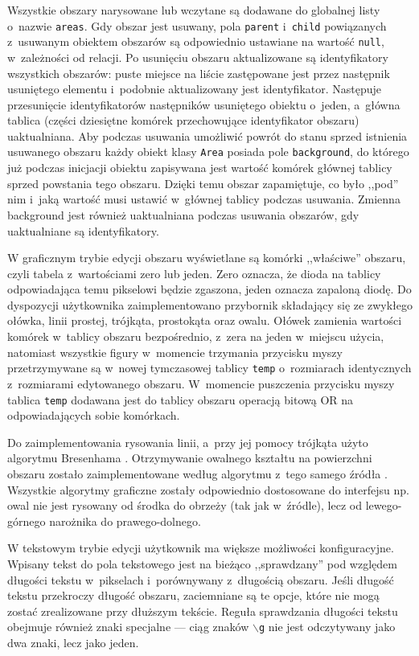 Wszystkie obszary narysowane lub wczytane są dodawane do globalnej listy o~nazwie \texttt{areas}. Gdy obszar jest usuwany, pola \texttt{parent} i~\texttt{child} powiązanych z~usuwanym obiektem obszarów są odpowiednio ustawiane na wartość \texttt{null}, w~zależności od relacji. Po usunięciu obszaru aktualizowane są identyfikatory wszystkich obszarów: puste miejsce na liście zastępowane jest przez następnik usuniętego elementu i~podobnie aktualizowany jest identyfikator. Następuje przesunięcie identyfikatorów następników usuniętego obiektu o~jeden, a~główna tablica (części dziesiętne komórek przechowujące identyfikator obszaru) uaktualniana. Aby podczas usuwania umożliwić powrót do stanu sprzed istnienia usuwanego obszaru każdy obiekt klasy \texttt{Area} posiada pole \texttt{background}, do którego już podczas inicjacji obiektu zapisywana jest wartość komórek głównej tablicy sprzed powstania tego obszaru. Dzięki temu obszar zapamiętuje, co było ,,pod'' nim i~jaką wartość musi ustawić w~głównej tablicy podczas usuwania. Zmienna background jest również uaktualniana podczas usuwania obszarów, gdy uaktualniane są identyfikatory.

W graficznym trybie edycji obszaru wyświetlane są komórki ,,właściwe'' obszaru, czyli tabela z~wartościami zero lub jeden. Zero oznacza, że dioda na tablicy odpowiadająca temu pikselowi będzie zgaszona, jeden oznacza zapaloną diodę. Do dyspozycji użytkownika zaimplementowano przybornik składający się ze zwykłego ołówka, linii prostej, trójkąta, prostokąta oraz owalu. Ołówek zamienia wartości komórek w~tablicy obszaru bezpośrednio, z~zera na jeden w~miejscu użycia, natomiast wszystkie figury w~momencie trzymania przycisku myszy przetrzymywane są w~nowej tymczasowej tablicy \texttt{temp} o~rozmiarach identycznych z~rozmiarami edytowanego obszaru. W~momencie puszczenia przycisku myszy tablica \texttt{temp} dodawana jest do tablicy obszaru operacją bitową OR na odpowiadających sobie komórkach.

Do zaimplementowania rysowania linii, a~przy jej pomocy trójkąta użyto algorytmu Bresenhama \cite{bresenham}. Otrzymywanie owalnego kształtu na powierzchni obszaru zostało zaimplementowane według algorytmu z~tego samego źródła \cite{ovals}. Wszystkie algorytmy graficzne zostały odpowiednio dostosowane do interfejsu np. owal nie jest rysowany od środka do obrzeży (tak jak w~źródle), lecz od lewego-górnego narożnika do prawego-dolnego.

W tekstowym trybie edycji użytkownik ma większe możliwości konfiguracyjne. Wpisany tekst do pola tekstowego jest na bieżąco ,,sprawdzany'' pod względem długości tekstu w~pikselach i~porównywany z~długością obszaru. Jeśli długość tekstu przekroczy długość obszaru, zaciemniane są te opcje, które nie mogą zostać zrealizowane przy dłuższym tekście. Reguła sprawdzania długości tekstu obejmuje również znaki specjalne --- ciąg znaków \texttt{$\backslash$g} nie jest odczytywany jako dwa znaki, lecz jako jeden.

